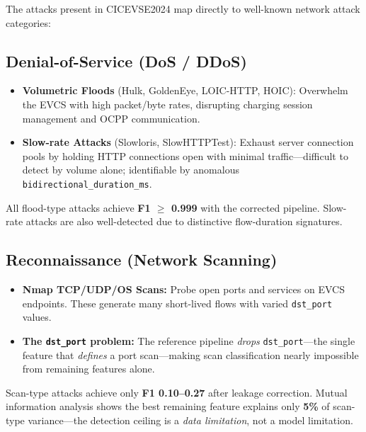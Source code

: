 \documentclass[11pt, a4paper]{article}
\begin{document}
The attacks present in CICEVSE2024 map directly to well-known network attack categories:

\subsection{Denial-of-Service (DoS / DDoS)}

\begin{itemize}[leftmargin=1.4em, itemsep=0.2em]
    \item \textbf{Volumetric Floods} (Hulk, GoldenEye, LOIC-HTTP, HOIC): Overwhelm the EVCS with high packet/byte rates, disrupting charging session management and OCPP communication.
    \item \textbf{Slow-rate Attacks} (Slowloris, SlowHTTPTest): Exhaust server connection pools by holding HTTP connections open with minimal traffic—difficult to detect by volume alone; identifiable by anomalous \texttt{bidirectional\_duration\_ms}.
\end{itemize}

\begin{resultbox}[title={\textbf{Detection Result — DoS}}]
    All flood-type attacks achieve \textbf{F1 $\geq$ 0.999} with the corrected pipeline. Slow-rate attacks are also well-detected due to distinctive flow-duration signatures.
\end{resultbox}

\subsection{Reconnaissance (Network Scanning)}

\begin{itemize}[leftmargin=1.4em, itemsep=0.2em]
    \item \textbf{Nmap TCP/UDP/OS Scans:} Probe open ports and services on EVCS endpoints. These generate many short-lived flows with varied \texttt{dst\_port} values.
    \item \textbf{The \texttt{dst\_port} problem:} The reference pipeline \textit{drops} \texttt{dst\_port}—the single feature that \textit{defines} a port scan—making scan classification nearly impossible from remaining features alone.
\end{itemize}

\begin{findingbox}[title={\textbf{Detection Result — Reconnaissance}}]
    Scan-type attacks achieve only \textbf{F1 0.10--0.27} after leakage correction. Mutual information analysis shows the best remaining feature explains only \textbf{5\%} of scan-type variance—the detection ceiling is a \textit{data limitation}, not a model limitation.
\end{findingbox}
\end{document}
